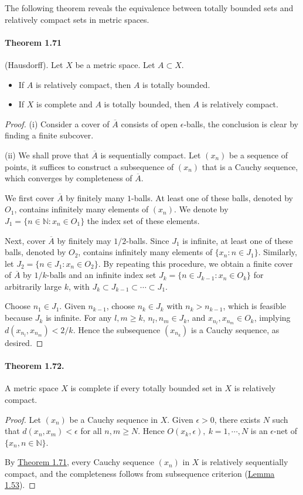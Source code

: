 \documentclass{article}
\begin{document}
The following theorem reveals the equivalence between totally bounded sets and relatively compact sets in metric spaces.

\paragraph{Theorem 1.71\label{thm:1.71}} (Hausdorff). Let $X$ be a metric space. Let $A\subset X$.
\begin{itemize}
	\item[(i)] If $A$ is relatively compact, then $A$ is totally bounded.
	\item[(ii)] If $X$ is complete and $A$ is totally bounded, then $A$ is relatively compact.
\end{itemize}
\begin{proof}
	(i) Consider a cover of $\overline{A}$ consists of open $\epsilon$-balls, the conclusion is clear by finding a finite subcover.
	
	(ii) We shall prove that $\overline{A}$ is sequentially compact. Let $(x_n)$ be a sequence of points, it suffices to construct a subsequence of $(x_n)$ that is a Cauchy sequence, which converges by completeness of $\overline{A}$.
	
	We first cover $\overline{A}$ by finitely many $1$-balls. At least one of these balls, denoted by $O_1$, contains infinitely many elements of $(x_n)$. We denote by $J_1=\{n\in\mathbb{N}:x_n\in O_1\}$ the index set of these elements.
	
	Next, cover $\overline{A}$ by finitely may $1/2$-balls. Since $J_1$ is infinite, at least one of these balls, denoted by $O_2$, contains infinitely many elements of $\{x_n:n\in J_1\}$. Similarly, let $J_2=\{n\in J_1:x_n\in O_2\}$. By repeating this procedure, we obtain a finite cover of $\overline{A}$ by $1/k$-balls and an infinite index set $J_k=\{n\in J_{k-1}:x_n\in O_{k}\}$ for arbitrarily large $k$, with $J_k\subset J_{k-1}\subset\cdots\subset J_1$.
	
	Choose $n_1\in J_1$. Given $n_{k-1}$, choose $n_k\in J_k$ with $n_k > n_{k-1}$, which is feasible because $J_k$ is infinite. For any $l,m\geq k$, $n_l,n_m\in J_k$, and $x_{n_l},x_{n_m}\in O_k$, implying $d(x_{n_l},x_{n_m})<2/k$. Hence the subsequence $(x_{n_k})$ is a Cauchy sequence, as desired.
\end{proof}

\paragraph{Theorem 1.72.\label{thm:1.72}} A metric space $X$ is complete if every totally bounded set in $X$ is relatively compact.
\begin{proof}
	Let $(x_n)$ be a Cauchy sequence in $X$. Given $\epsilon>0$, there exists $N$ such that $d(x_n,x_m)<\epsilon$ for all $n,m\geq N$. Hence $O(x_k,\epsilon),\ k=1,\cdots,N$ is an $\epsilon$-net of $\{x_n,n\in\mathbb{N}\}$.
	
	By \hyperref[thm:1.71]{Theorem 1.71}, every Cauchy sequence $(x_n)$ in $X$ is relatively sequentially compact, and the completeness follows from subsequence criterion (\hyperref[lemma:1.53]{Lemma 1.53}).
\end{proof}
\end{document}
